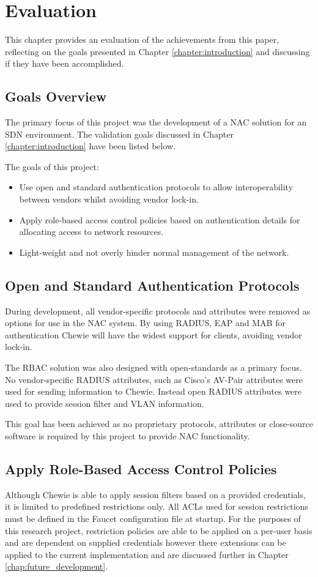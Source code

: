 \chapter{Evaluation}
This chapter provides an evaluation of the achievements from this paper, reflecting on the goals presented in Chapter \ref{chapter:introduction} and discussing if they have been accomplished.

\section{Goals Overview}
The primary focus of this project was the development of a NAC solution for an SDN environment. The validation goals discussed in Chapter \ref{chapter:introduction} have been listed below.

The goals of this project:
\begin{itemize}
    \item Use open and standard authentication protocols to allow interoperability between vendors whilst avoiding vendor lock-in. 
    \item Apply role-based access control policies based on authentication details for allocating access to network resources. 
    \item Light-weight and not overly hinder normal management of the network.
\end{itemize}

\section{Open and Standard Authentication Protocols}
During development, all vendor-specific protocols and attributes were removed as options for use in the NAC system. By using RADIUS, EAP and MAB for authentication Chewie will have the widest support for clients, avoiding vendor lock-in. 

The RBAC solution was also designed with open-standards as a primary focus. No vendor-specific RADIUS attributes, such as Cisco's AV-Pair attributes were used for sending information to Chewie. Instead open RADIUS attributes were used to provide session filter and VLAN information.

This goal has been achieved as no proprietary protocols, attributes or close-source software is required by this project to provide NAC functionality.

\section{Apply Role-Based Access Control Policies}
Although Chewie is able to apply session filters based on a provided credentials, it is limited to predefined restrictions only. All ACLs used for session restrictions must be defined in the Faucet configuration file at startup. 
For the purposes of this research project, restriction policies are able to be applied on a per-user basis and are dependent on supplied credentials however there extensions can be applied to the current implementation and are discussed further in Chapter \ref{chap:future_development}.

